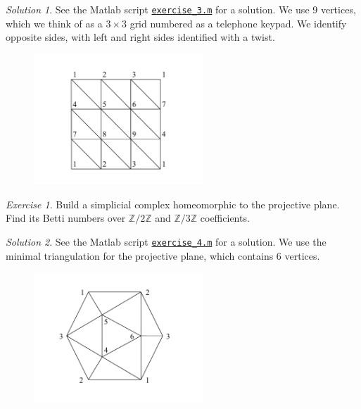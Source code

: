 \documentclass[amscd, amssymb, verbatim]{amsart}[12pt]
\theoremstyle{remark}
\theoremstyle{remark}
\newtheorem{exerciseSol}{Exercise}
\theoremstyle{remark}
\newtheorem*{solution}{Solution}
\newcommand{\Z}{\mathbb{Z}}
\begin{document}
\begin{solution}
See the Matlab script \href{https://github.com/appliedtopology/javaplex/tree/master/src/matlab/for_distribution/tutorial_solutions/exercise_3.m}{\texttt{exercise\_3.m}} for a solution. We use 9 vertices, which we think of as a $3 \times 3$ grid numbered as a telephone keypad. We identify opposite sides, with left and right sides identified with a twist. 
\end{solution}

\begin{figure}[htp]
  \begin{center}
    \includegraphics[width=2.5in]{klein}
   \end{center}
\end{figure}
\FloatBarrier

\begin{exerciseSol}
Build a simplicial complex homeomorphic to the projective plane. Find its Betti numbers over $\Z/2\Z$ and $\Z/3\Z$ coefficients.
\end{exerciseSol}

\begin{solution}
See the Matlab script \href{https://github.com/appliedtopology/javaplex/tree/master/src/matlab/for_distribution/tutorial_solutions/exercise_4.m}{\texttt{exercise\_4.m}} for a solution. We use the minimal triangulation for the projective plane, which contains 6 vertices.
\end{solution}

\begin{figure}[htp]
  \begin{center}
    \includegraphics[width=2.5in]{projPlane}
   \end{center}
\end{figure}
\FloatBarrier
\end{document}

